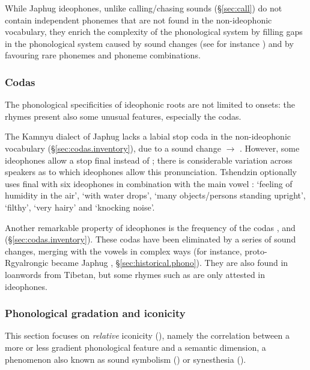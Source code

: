 
While Japhug ideophones, unlike calling/chasing sounds (§\ref{sec:call}) do not contain independent phonemes that are not found  in the non-ideophonic vocabulary, they enrich the complexity of the phonological system by filling gaps in the phonological system caused by sound changes (see for instance \citealt{diffloth79expressive}) and by favouring rare phonemes and phoneme combinations.

\subsubsection{Codas} \label{sec:coda.idph}
The phonological specificities of ideophonic roots are not limited to onsets: the rhymes present also some unusual features, especially the codas.

The Kamnyu dialect of Japhug lacks a labial stop coda in the non-ideophonic vocabulary (§\ref{sec:codas.inventory}), due to a sound change  $\rightarrow$ . However, some ideophones allow a stop final   instead of ; there is considerable variation across speakers as to which ideophones allow this pronunciation. Tshendzin optionally uses final  with six ideophones in combination with the main vowel :  `feeling of humidity in the air',  `with water drops',  `many objects/persons standing upright',  `filthy',  `very hairy' and  `knocking noise'.

Another remarkable property of ideophones is the frequency of the codas ,  and  (§\ref{sec:codas.inventory}). These codas have been eliminated by a series of sound changes, merging with the vowels in complex ways (for instance, proto-Rgyalrongic  became Japhug , §\ref{sec:historical.phono}). They are also found in loanwords from Tibetan, but some rhymes such as  are only attested in ideophones.
 
 
\subsubsection{Phonological gradation and iconicity} \label{sec:idph.gradation}
This section focuses on \textit{relative} iconicity (\citealt[47]{dingemanse11ezra}), namely the correlation between a more or less gradient phonological feature and a semantic dimension, a phenomenon also known as sound symbolism  (\citealt[16]{deloria41})  or synesthesia (\citealt[186--187]{gerner04expressives1}).
 
